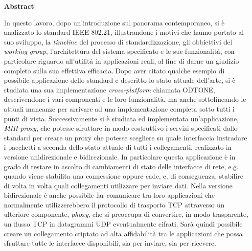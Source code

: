 \begin{center}
\LARGE{\textbf{Abstract}}
\end{center}
\vspace{3em}
In questo lavoro, dopo un'introduzione sul panorama contemporaneo, si è analizzato lo standard IEEE 802.21, illustrandone i motivi che hanno portato al suo sviluppo, la {\em timeline} del processo di standardizzazione, gli obbiettivi del {\em working group}, l'architettura del sistema specificato e le sue funzionalità, con particolare riguardo all'utilità in applicazioni reali, al fine di darne un giudizio completo sulla sua effettiva efficacia. Dopo aver citato qualche esempio di possibile applicazione dello standard e descritto lo stato attuale dell'arte, si è studiata una sua implementazione {\em cross-platform} chiamata ODTONE, descrivendone i vari componenti e le loro funzionalità, ma anche sottolineando le attuali mancanze per arrivare ad una implementazione completa sotto tutti i punti di vista. Successivamente si è studiata ed implementata un'applicazione, {\em MIH-proxy}, che potesse sfruttare in modo costruttivo i servizi specificati dallo standard per creare un proxy che potesse scegliere su quale interfaccia instradare i pacchetti a seconda dello stato attuale di tutti i collegamenti, realizzato in versione unidirezionale e bidirezionale. In particolare questa applicazione è in grado di restare in ascolto di cambiamenti di stato delle interfacce di rete, e.g. quando viene stabilita una connessione oppure cade, e, di conseguenza, stabilire di volta in volta quali collegamenti utilizzare per inviare dati. Nella versione bidirezionale è anche possibile far comunicare tra loro applicazioni che normalmente utilizzerebbero il protocollo di trasporto TCP attraverso un ulteriore componente, {\em phoxy}, che si preoccupa di convertire, in modo trasparente, un flusso TCP in datagrammi UDP eventualmente cifrati. Sarà quindi possibile creare un collegamento criptato ad alta affidabilità tra le applicazioni che possa sfruttare tutte le interfacce disponibili, sia per inviare, sia per ricevere.